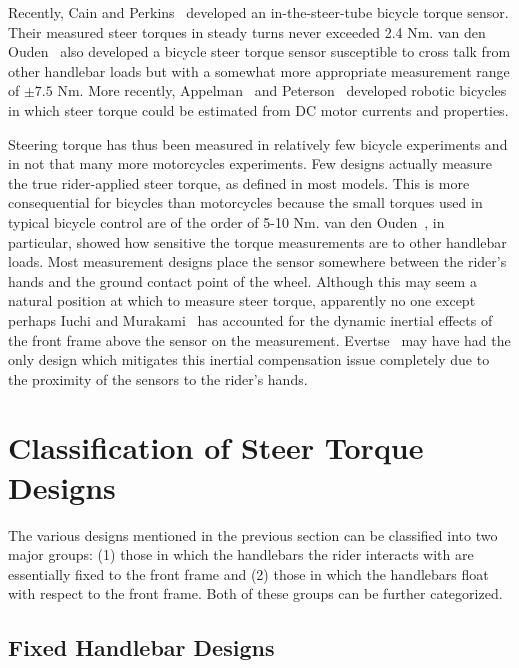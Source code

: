 \documentclass[10pt]{article}
\begin{document}
Recently, Cain and Perkins~\cite{Cain2010,Cain2012} developed an
in-the-steer-tube bicycle torque sensor. Their measured steer torques in steady
turns never exceeded 2.4 Nm. van den Ouden~\cite{Ouden2011} also developed a
bicycle steer torque sensor susceptible to cross talk from other handlebar
loads but with a somewhat more appropriate measurement range of $\pm7.5$ Nm.
More recently, Appelman~\cite{Appelman2012} and Peterson~\cite{Peterson2013}
developed robotic bicycles in which steer torque could be estimated from DC
motor currents and properties.



Steering torque has thus been measured in relatively few bicycle experiments
and in not that many more motorcycles experiments. Few designs actually measure
the true rider-applied steer torque, as defined in most models. This is more
consequential for bicycles than motorcycles because the small torques used in
typical bicycle control are of the order of 5-10 Nm. van den
Ouden~\cite{Ouden2011}, in particular, showed how sensitive the torque
measurements are to other handlebar loads. Most measurement designs place the
sensor somewhere between the rider's hands and the ground contact point of the
wheel. Although this may seem a natural position at which to measure steer
torque, apparently no one except perhaps Iuchi and Murakami~\cite{Iuchi2006}
has accounted for the dynamic inertial effects of the front frame above the
sensor on the measurement. Evertse~\cite{Evertse2010} may have had the only
design which mitigates this inertial compensation issue completely due to the
proximity of the sensors to the rider's hands.


\section*{Classification of Steer Torque Designs}

The various designs mentioned in the previous section can be classified into
two major groups: (1) those in which the handlebars the rider interacts with
are essentially fixed to the front frame and (2) those in which the handlebars
float with respect to the front frame. Both of these groups can be further
categorized.

\subsection*{Fixed Handlebar Designs}
\end{document}
